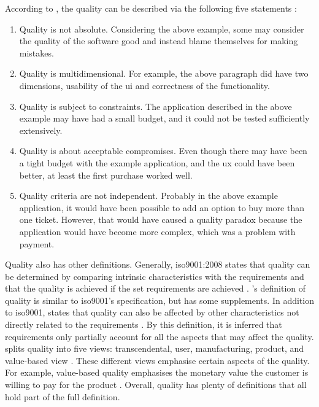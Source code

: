 \begin{minipage}{\textwidth}
	According to \citeauthor{gillies2011software}, the quality can be described via the following five statements \cite{gillies2011software}:
	\begin{enumerate}[noitemsep]
		\item\label{quality1} Quality is not absolute. Considering the above example, some may consider the quality of the software good and instead blame themselves for making mistakes.
		\item\label{quality2} Quality is multidimensional. For example, the above paragraph did have two dimensions, usability of the \gls{ui} and correctness of the functionality.
		\item\label{quality3} Quality is subject to constraints. The application described in the above example may have had a small budget, and it could not be tested sufficiently extensively.
		\item\label{quality4} Quality is about acceptable compromises. Even though there may have been a tight budget with the example application, and the \gls{ux} could have been better, at least the first purchase worked well.
		\item\label{quality5} Quality criteria are not independent. Probably in the above example application, it would have been possible to add an option to buy more than one ticket. However, that would have caused a quality paradox because the application would have become more complex, which was a problem with payment.
	\end{enumerate}
\end{minipage}

Quality also has other definitions. Generally, \gls{iso}9001:2008 states that quality can be determined by comparing intrinsic characteristics with the requirements and that the quality is achieved if the set requirements are achieved \cite{iso9001}. \citeauthor{petrasch1999definition}'s definition of quality is similar to \gls{iso}9001's specification, but has some supplements. In addition to \gls{iso}9001, \citeauthor{petrasch1999definition} states that quality can also be affected by other characteristics not directly related to the requirements \cite{petrasch1999definition}. By this definition, it is inferred that requirements only partially account for all the aspects that may affect the quality. \citeauthor{garvin1988managing} splits quality into five views: transcendental, user, manufacturing, product, and value-based view \cite{garvin1988managing}. These different views emphasise certain aspects of the quality. For example, value-based quality emphasises the monetary value the customer is willing to pay for the product \cite{garvin1988managing}. Overall, quality has plenty of definitions that all hold part of the full definition.

